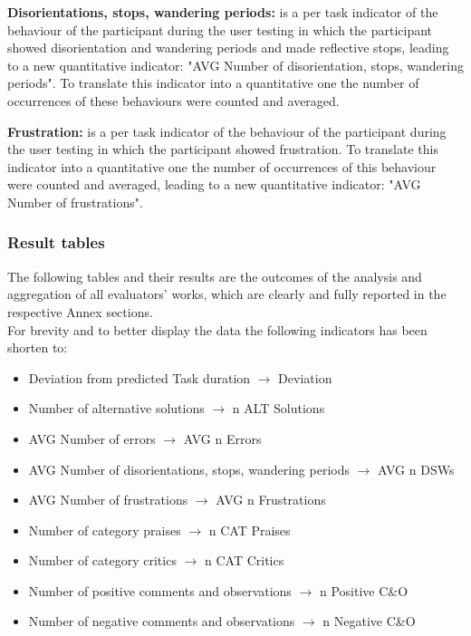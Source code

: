 \vspace{0.25cm}

\textbf{Disorientations, stops, wandering periods:} is a per task indicator of the behaviour of the participant during the user testing in which the participant showed disorientation and wandering periods and made reflective stops, leading to a new quantitative indicator: "AVG Number of disorientation, stops, wandering periods". To translate this indicator into a quantitative one the number of occurrences of these behaviours were counted  and averaged.

\vspace{0.25cm}

\textbf{Frustration:} is a per task indicator of the behaviour of the participant during the user testing in which the participant showed frustration. To translate this indicator into a quantitative one the number of occurrences of this behaviour were counted  and averaged, leading to a new quantitative indicator: "AVG Number of frustrations".

\newpage

\subsubsection*{Result tables}
The following tables and their results are the outcomes of the analysis and aggregation of all evaluators' works, which are clearly and fully reported in the respective Annex sections.\\
For brevity and to better display the data the following indicators has been shorten to:
\begin{itemize}
	\item Deviation from predicted Task duration $\rightarrow$ Deviation
	\item Number of alternative solutions $\rightarrow$ n ALT Solutions
	\item AVG Number of errors $\rightarrow$ AVG n Errors
	\item AVG Number of disorientations, stops, wandering periods $\rightarrow$ AVG n DSWs
	\item AVG Number of frustrations $\rightarrow$ AVG n Frustrations
	\item Number of category praises $\rightarrow$ n CAT Praises
	\item Number of category critics $\rightarrow$ n CAT Critics
	\item Number of positive comments and observations $\rightarrow$ n Positive C\&O
	\item Number of negative comments and observations $\rightarrow$ n Negative C\&O
\end{itemize}

